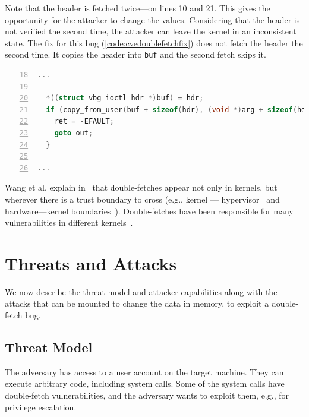 \documentclass[conference]{IEEEtran}
\begin{document}
Note that the header is fetched twice---on lines 10 and 21. This gives the
opportunity for the attacker to change the values. Considering
that the header is not verified the second time, the attacker can
leave the kernel in an inconsistent state. The fix for this bug
(\autoref{code:cvedoublefetchfix}) does not fetch the header the second time. It
copies the header into \texttt{buf} and the second fetch skips it.

\begin{lstlisting}[language=C, caption=CVE-2018-12633 Double Fetch Fix~\cite{cve201812633fix},
  label=code:cvedoublefetchfix,  breaklines=true
  postbreak=\mbox{\textcolor{red}{$\hookrightarrow$}\space},
  numbers=left,basicstyle=\scriptsize, firstnumber=18, xleftmargin=5.0ex]
...

  *((struct vbg_ioctl_hdr *)buf) = hdr;
  if (copy_from_user(buf + sizeof(hdr), (void *)arg + sizeof(hdr), hdr.size_in - sizeof(hdr))) {
    ret = -EFAULT;
    goto out;
  }

...

\end{lstlisting}

Wang et al. explain in~\cite{wang2018survey} that double-fetches appear not only
in kernels, but wherever there is a trust boundary to cross (e.g., kernel ---
hypervisor~\cite{wilhelm2016xenpwn} and hardware---kernel
boundaries~\cite{lu2018untrusted}). Double-fetches have been responsible for many
vulnerabilities in different kernels~\cite{jurczyk2013bochspwn, wang2018survey}.


\section{Threats and Attacks}

We now describe the threat model and attacker capabilities along with the
attacks that can be mounted to change the data in memory, to exploit a
double-fetch bug.


\subsection{Threat Model}
\label{sec:threatmodel}

The adversary has access to a user account on the target machine. They can
execute arbitrary code, including system calls. Some of the system calls
have double-fetch vulnerabilities, and the adversary wants to exploit them,
e.g., for privilege escalation.
\end{document}
